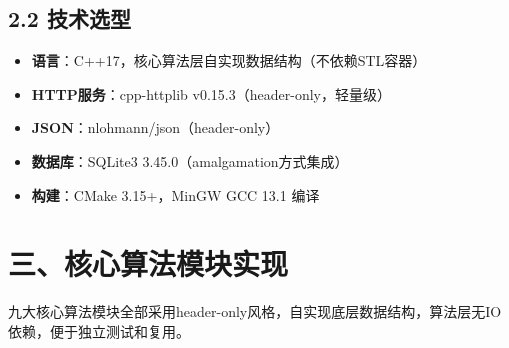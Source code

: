 \documentclass[12pt,a4paper]{article}
\begin{document}
\subsection*{2.2 技术选型}

\begin{itemize}[leftmargin=2em]
    \item \textbf{语言}：C++17，核心算法层自实现数据结构（不依赖STL容器）
    \item \textbf{HTTP服务}：cpp-httplib v0.15.3（header-only，轻量级）
    \item \textbf{JSON}：nlohmann/json（header-only）
    \item \textbf{数据库}：SQLite3 3.45.0（amalgamation方式集成）
    \item \textbf{构建}：CMake 3.15+，MinGW GCC 13.1 编译
\end{itemize}

\section*{三、核心算法模块实现}

九大核心算法模块全部采用header-only风格，自实现底层数据结构，算法层无IO依赖，便于独立测试和复用。
\end{document}
